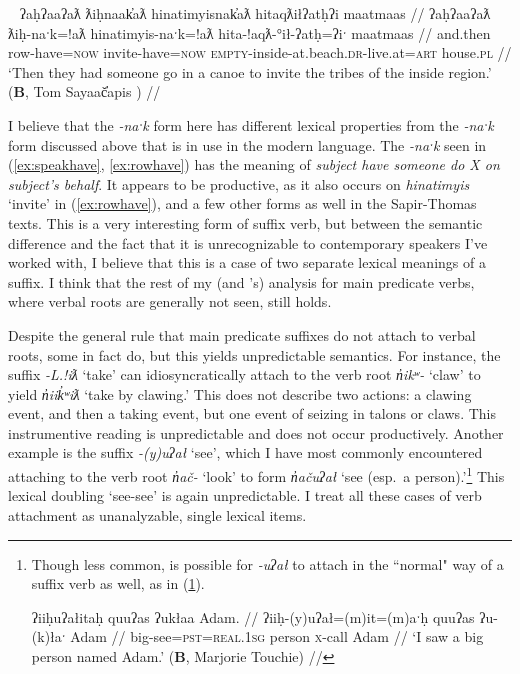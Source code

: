 \ex~ \label{ex:rowhave}
\begingl
\glpreamble ʔaḥʔaaʔaƛ ƛiḥnaak̓aƛ hinatimyisnak̓aƛ hitaqƛiłʔatḥʔi maatmaas //
\gla ʔaḥʔaaʔaƛ ƛiḥ-naˑk=!aƛ hinatimyis-naˑk=!aƛ hita-!aqƛ-°ił-ʔatḥ=ʔiˑ maatmaas //
\glb and.then row-have=\textsc{now} invite-have=\textsc{now} \textsc{empty}-inside-at.beach.\textsc{dr}-live.at=\textsc{art} house.\textsc{pl} //
\glft `Then they had someone go in a canoe to invite the tribes of the inside region.' (\textbf{B}, Tom Sayaač̓apis \citealt[p.~297--298]{sapir1955}) //
\endgl
\xe

\vspace{-5pt}

I believe that the \textit{-naˑk} form here has different lexical properties from the \textit{-naˑk} form discussed above that is in use in the modern language. The \textit{-naˑk} seen in (\ref{ex:speakhave}, \ref{ex:rowhave}) has the meaning of \textit{subject have someone do X on subject's behalf}. It appears to be productive, as it also occurs on \textit{hinatimyis} `invite' in (\ref{ex:rowhave}), and a few other forms as well in the Sapir-Thomas texts. This is a very interesting form of suffix verb, but between the semantic difference and the fact that it is unrecognizable to contemporary speakers I've worked with, I believe that this is a case of two separate lexical meanings of a suffix. I think that the rest of my (and \citeauthor{wojdak2005}'s) analysis for main predicate verbs, where verbal roots are generally not seen, still holds.

Despite the general rule that main predicate suffixes do not attach to verbal roots, some in fact do, but this yields unpredictable semantics. For instance, the suffix \textit{-L.!iƛ} `take' can idiosyncratically attach to the verb root \textit{n̓ikʷ-} `claw' to yield \textit{n̓iik̓ʷiƛ} `take by clawing.' This does not describe two actions: a clawing event, and then a taking event, but one event of seizing in talons or claws. This instrumentive reading is unpredictable and does not occur productively. Another example is the suffix \textit{-(y)uʔał} `see', which I have most commonly encountered attaching to the verb root \textit{n̓ač-} `look' to form \textit{n̓ačuʔał} `see (esp.\ a person).'\footnote{Though less common, is possible for \textit{-uʔał} to attach in the ``normal" way of a suffix verb as well, as in (\ref{ex:sawabigman}).

\ex \label{ex:sawabigman}
\begingl
\glpreamble ʔiiḥuʔałitaḥ quuʔas ʔukłaa Adam. //
\gla ʔiiḥ-(y)uʔał=(m)it=(m)aˑḥ quuʔas ʔu-(k)łaˑ Adam //
\glb big-see=\textsc{pst}=\textsc{real.1sg} person \textsc{x}-call Adam //
\glft `I saw a big person named Adam.' (\textbf{B}, Marjorie Touchie) //
\endgl
\xe
} This lexical doubling `see-see' is again unpredictable. I treat all these cases of verb attachment as unanalyzable, single lexical items.

